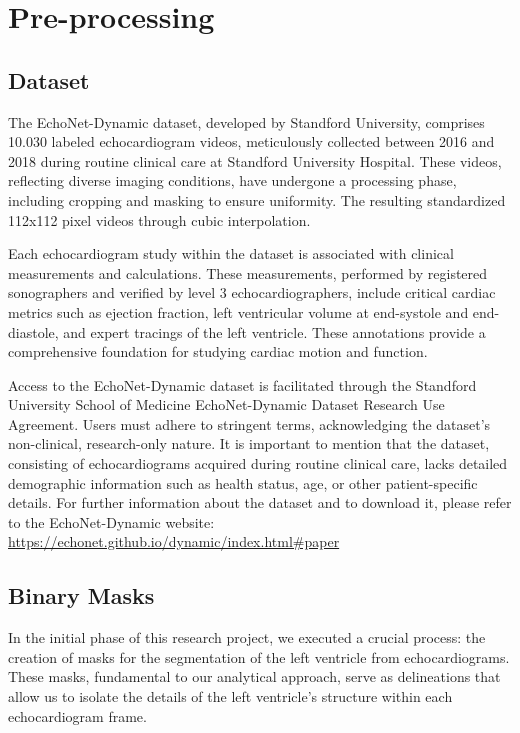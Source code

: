 \documentclass[runningheads]{llncs}
\begin{document}
\section{Pre-processing}
\subsection{Dataset}

The EchoNet-Dynamic dataset, developed by Standford University, comprises 10.030 labeled echocardiogram videos, meticulously collected between 2016 and 2018 during routine clinical care at Standford University Hospital. These videos, reflecting diverse imaging conditions, have undergone a processing phase, including cropping and masking to ensure uniformity. The resulting standardized 112x112 pixel videos through cubic interpolation. \cite{echo}

Each echocardiogram study within the dataset is associated with clinical measurements and calculations. These measurements, performed by registered sonographers and verified by level 3 echocardiographers, include critical cardiac metrics such as ejection fraction, left ventricular volume at end-systole and end-diastole, and expert tracings of the left ventricle. These annotations provide a comprehensive foundation for studying cardiac motion and function.

Access to the EchoNet-Dynamic dataset is facilitated through the Standford University School of Medicine EchoNet-Dynamic Dataset Research Use Agreement. Users must adhere to stringent terms, acknowledging the dataset's non-clinical, research-only nature. It is important to mention that the dataset, consisting of echocardiograms acquired during routine clinical care, lacks detailed demographic information such as health status, age, or other patient-specific details.
For further information about the dataset and to download it, please refer to the EchoNet-Dynamic website: \url{https://echonet.github.io/dynamic/index.html#paper}



\subsection{Binary Masks} 
In the initial phase of this research project, we executed a crucial process: the creation of masks for the segmentation of the left ventricle from echocardiograms. These masks, fundamental to our analytical approach, serve as delineations that allow us to isolate the details of the left ventricle's structure within each echocardiogram frame.
\end{document}

